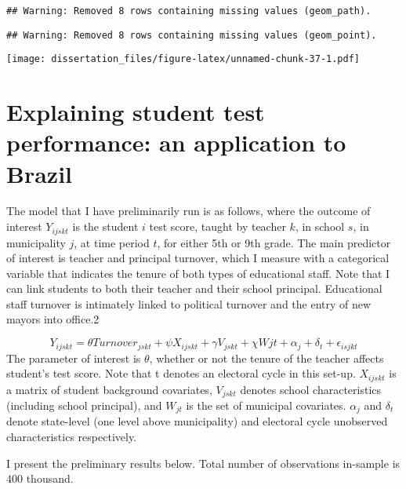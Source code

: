 \documentclass[12pt,]{book}
\begin{document}
\begin{verbatim}
## Warning: Removed 8 rows containing missing values (geom_path).
\end{verbatim}

\begin{verbatim}
## Warning: Removed 8 rows containing missing values (geom_point).
\end{verbatim}

\texttt{[image: dissertation\_files/figure-latex/unnamed-chunk-37-1.pdf]}

\hypertarget{explaining-student-test-performance-an-application-to-brazil}{%
\section{Explaining student test performance: an application to Brazil}\label{explaining-student-test-performance-an-application-to-brazil}}

The model that I have preliminarily run is as follows, where the outcome of interest \(Y_{ijskt}\)
is the student \(i\) test score, taught by teacher \(k\), in school \(s\), in municipality \(j\), at time period \(t\), for either 5th or 9th grade. The main predictor of interest is teacher and principal turnover, which I measure with a categorical variable that indicates the tenure of both types of educational staff. Note that I can link students to both their teacher and their school principal. Educational staff turnover is intimately linked to political turnover and the entry of new mayors into office.2

\[Y_{ijskt} = \theta Turnover_{jskt} +\psi X_{ijskt} + \gamma V_{jskt} +\chi Wjt+ \alpha_j + \delta_t+ \epsilon_{isjkt}\]
The parameter of interest is \(\theta\), whether or not the tenure of the teacher affects student's test score. Note that t denotes an electoral cycle in this set-up. \(X_{ijskt}\) is a matrix of student background covariates, \(V_{jskt}\) denotes school characteristics (including school principal), and \(W_{jt}\) is the set of municipal covariates. \(\alpha_j\) and \(\delta_t\) denote state-level (one level above municipality) and electoral cycle unobserved characteristics respectively.

I present the preliminary results below. Total number of observations in-sample is 400 thousand.
\end{document}
